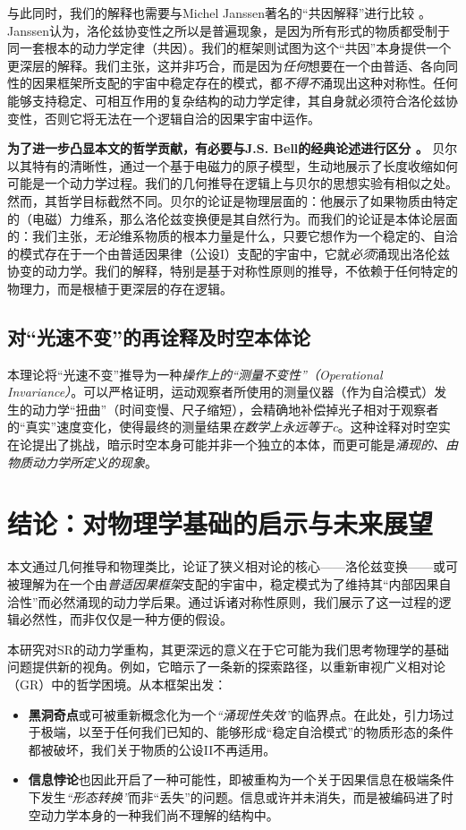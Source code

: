 \documentclass[12pt, a4paper]{article}
\begin{document}
与此同时，我们的解释也需要与Michel Janssen著名的``共因解释''进行比较 \cite{Janssen2002}。Janssen认为，洛伦兹协变性之所以是普遍现象，是因为所有形式的物质都受制于同一套根本的动力学定律（共因）。我们的框架则试图为这个``共因''本身提供一个更深层的解释。我们主张，这并非巧合，而是因为\textit{任何}想要在一个由普适、各向同性的因果框架所支配的宇宙中稳定存在的模式，都\textit{不得不}涌现出这种对称性。任何能够支持稳定、可相互作用的复杂结构的动力学定律，其自身就必须符合洛伦兹协变性，否则它将无法在一个逻辑自洽的因果宇宙中运作。

\textbf{为了进一步凸显本文的哲学贡献，有必要与J.S. Bell的经典论述进行区分 \cite{Bell1976}。} 贝尔以其特有的清晰性，通过一个基于电磁力的原子模型，生动地展示了长度收缩如何可能是一个动力学过程。我们的几何推导在逻辑上与贝尔的思想实验有相似之处。然而，其哲学目标截然不同。贝尔的论证是物理层面的：他展示了如果物质由特定的（电磁）力维系，那么洛伦兹变换便是其自然行为。而我们的论证是本体论层面的：我们主张，\textit{无论}维系物质的根本力量是什么，只要它想作为一个稳定的、自洽的模式存在于一个由普适因果律（公设I）支配的宇宙中，它就\textit{必须}涌现出洛伦兹协变的动力学。我们的解释，特别是基于对称性原则的推导，不依赖于任何特定的物理力，而是根植于更深层的存在逻辑。

\subsection{对``光速不变''的再诠释及时空本体论}
本理论将``光速不变''推导为一种\textit{操作上的``测量不变性''（Operational Invariance）}。可以严格证明，运动观察者所使用的测量仪器（作为自洽模式）发生的动力学``扭曲''（时间变慢、尺子缩短），会精确地补偿掉光子相对于观察者的``真实''速度变化，使得最终的测量结果\textit{在数学上永远等于c}。这种诠释对时空实在论提出了挑战，暗示时空本身可能并非一个独立的本体，而更可能是\textit{涌现的、由物质动力学所定义的现象}。

\section{结论：对物理学基础的启示与未来展望}

本文通过几何推导和物理类比，论证了狭义相对论的核心——洛伦兹变换——或可被理解为在一个由\textit{普适因果框架}支配的宇宙中，稳定模式为了维持其``内部因果自洽性''而必然涌现的动力学后果。通过诉诸对称性原则，我们展示了这一过程的逻辑必然性，而非仅仅是一种方便的假设。

本研究对SR的动力学重构，其更深远的意义在于它可能为我们思考物理学的基础问题提供新的视角。例如，它暗示了一条新的探索路径，以重新审视广义相对论（GR）中的哲学困境。从本框架出发：
\begin{itemize}
    \item \textbf{黑洞奇点}或可被重新概念化为一个\textit{``涌现性失效''}的临界点。在此处，引力场过于极端，以至于任何我们已知的、能够形成``稳定自洽模式''的物质形态的条件都被破坏，我们关于物质的公设II不再适用。
    \item \textbf{信息悖论}也因此开启了一种可能性，即被重构为一个关于因果信息在极端条件下发生\textit{``形态转换''}而非``丢失''的问题。信息或许并未消失，而是被编码进了时空动力学本身的一种我们尚不理解的结构中。
\end{itemize}
\end{document}
